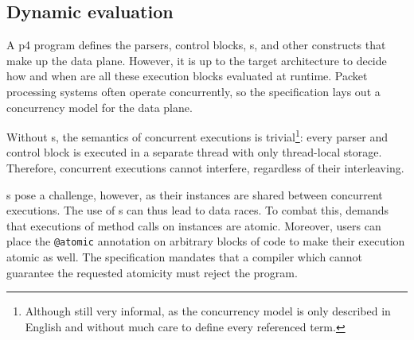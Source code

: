 \subsection*{Dynamic evaluation}

A \acrshort{p4} program defines the parsers, control blocks, \extern{}s, and
other constructs that make up the data plane. However, it is up to the target
architecture to decide how and when are all these execution blocks evaluated at
runtime. Packet processing systems often operate concurrently, so the \pfs
specification lays out a concurrency model for the data plane.

Without \extern{}s, the semantics of concurrent executions is
trivial\footnote{Although still very informal, as the concurrency model is only
described in English and without much care to define every referenced term.}:
every parser and control block is executed in a separate thread with only
thread-local storage. Therefore, concurrent executions cannot interfere,
regardless of their interleaving.

\extern{}s pose a challenge, however, as their instances are shared between
concurrent executions. The use of \extern{}s can thus lead to data races. To
combat this, \pfs demands that executions of method calls on \extern{} instances
are atomic. Moreover, users can place the \texttt{@atomic} annotation on
arbitrary blocks of code to make their execution atomic as well. The
specification mandates that a compiler which cannot guarantee the requested
atomicity must reject the program.
